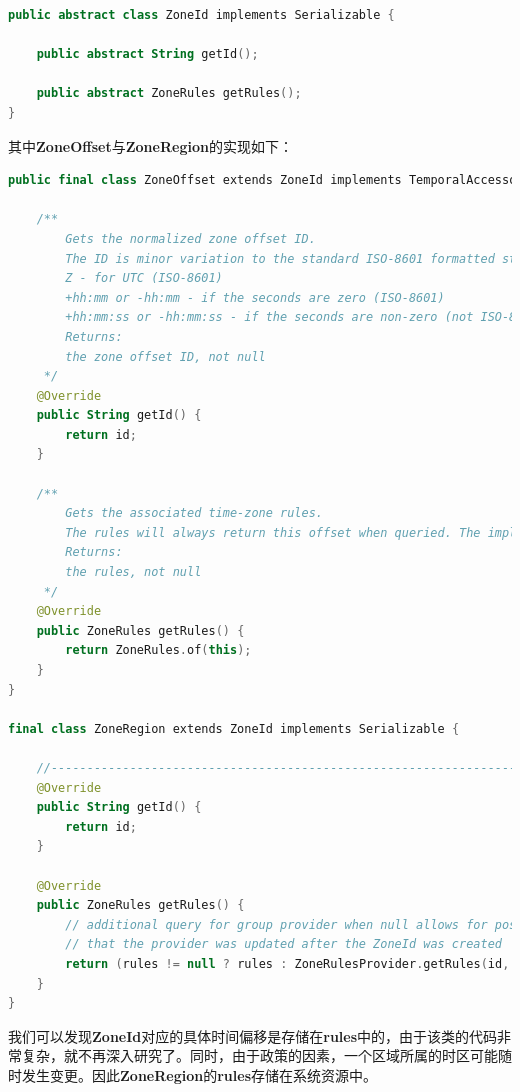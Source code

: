 \documentclass[cn,10pt,math=newtx,citestyle=gb7714-2015,bibstyle=gb7714-2015]{elegantbook}
\begin{document}
    \begin{lstlisting}[language=Kotlin]
public abstract class ZoneId implements Serializable {
    
    public abstract String getId();

    public abstract ZoneRules getRules();
}

    \end{lstlisting}

    其中\textbf{ZoneOffset}与\textbf{ZoneRegion}的实现如下：

    \begin{lstlisting}[language=Kotlin]
public final class ZoneOffset extends ZoneId implements TemporalAccessor, TemporalAdjuster, Comparable<ZoneOffset>, Serializable {
    
    /**
        Gets the normalized zone offset ID.
        The ID is minor variation to the standard ISO-8601 formatted string for the offset. There are three formats:
        Z - for UTC (ISO-8601)
        +hh:mm or -hh:mm - if the seconds are zero (ISO-8601)
        +hh:mm:ss or -hh:mm:ss - if the seconds are non-zero (not ISO-8601)
        Returns:
        the zone offset ID, not null
     */
    @Override
    public String getId() {
        return id;
    }
    
    /**
        Gets the associated time-zone rules.
        The rules will always return this offset when queried. The implementation class is immutable, thread-safe and serializable.
        Returns:
        the rules, not null
     */
    @Override
    public ZoneRules getRules() {
        return ZoneRules.of(this);
    }
}

final class ZoneRegion extends ZoneId implements Serializable {

    //-----------------------------------------------------------------------
    @Override
    public String getId() {
        return id;
    }

    @Override
    public ZoneRules getRules() {
        // additional query for group provider when null allows for possibility
        // that the provider was updated after the ZoneId was created
        return (rules != null ? rules : ZoneRulesProvider.getRules(id, false));
    }
}
    \end{lstlisting}

    我们可以发现\textbf{ZoneId}对应的具体时间偏移是存储在\textbf{rules}中的，由于该类的代码非常复杂，就不再深入研究了。同时，由于政策的因素，一个区域所属的时区可能随时发生变更。因此\textbf{ZoneRegion}的\textbf{rules}存储在系统资源中。
\end{document}

